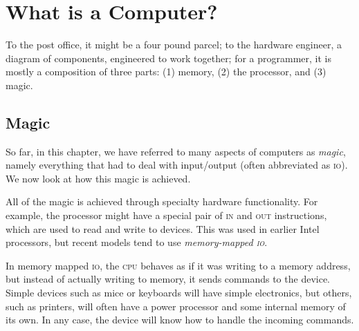 \newcommand\instruction[1]{\textsc{#1}}%
\chapter{What is a Computer?}

To the post office, it might be a four pound parcel; to the hardware engineer,
a diagram of components, engineered to work together; for a programmer, it is
mostly a composition of three parts: (1) memory, (2) the processor, and (3)
magic.

\section{Magic}

So far, in this chapter, we have referred to many aspects of computers as
\textit{magic}, namely everything that had to deal with input/output (often
abbreviated as \textsc{io}). We now look at how this magic is achieved.

All of the magic is achieved through specialty hardware functionality. For
example, the processor might have a special pair of \instruction{in} and
\instruction{out} instructions, which are used to read and write to devices.
This was used in earlier Intel processors, but recent models tend to use
\emph{memory-mapped \textsc{io}}.

In memory mapped \textsc{io}, the \textsc{cpu} behaves as if it was writing to
a memory address, but instead of actually writing to memory, it sends commands
to the device. Simple devices such as mice or keyboards will have simple
electronics, but others, such as printers, will often have a power processor
and some internal memory of its own. In any case, the device will know how to
handle the incoming commands.

